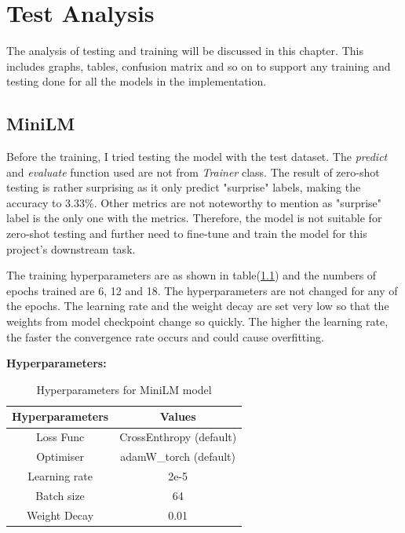 
\chapter{Test Analysis}
The analysis of testing and training will be discussed in this chapter. This includes graphs, tables, confusion matrix and so on to support any training and testing done for all the models in the implementation.

\section{MiniLM}
Before the training, I tried testing the model with the test dataset. The \textit{predict} and \textit{evaluate} function used are not from \textit{Trainer} class. The result of zero-shot testing is rather surprising as it only predict "surprise" labels, making the accuracy to 3.33\%. Other metrics are not noteworthy to mention as "surprise" label is the only one with the metrics. Therefore, the model is not suitable for zero-shot testing and further need to fine-tune and train the model for this project's downstream task. 

The training hyperparameters are as shown in table(\ref{tab:hyp_MiniLM}) and the numbers of epochs trained are 6, 12 and 18. The hyperparameters are not changed for any of the epochs. The learning rate and the weight decay are set very low so that the weights from model checkpoint change so quickly. The higher the learning rate, the faster the convergence rate occurs and could cause overfitting.

\textbf{Hyperparameters:}

\begin{table}[h!]
    \centering
    \begin{tabular}{c|c}
        Hyperparameters & Values\\\hline
        Loss Func & CrossEnthropy (default)\\
        Optimiser & adamW\_torch (default)\\
        Learning rate & 2e-5\\
        Batch size & 64\\
        Weight Decay & 0.01\\
    \end{tabular}
    \caption{Hyperparameters for MiniLM model}
    \label{tab:hyp_MiniLM}
\end{table}

